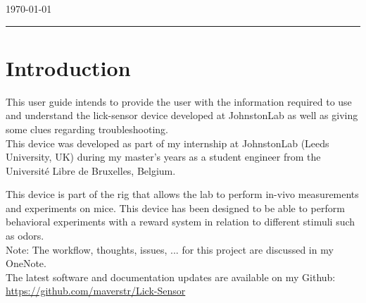 \documentclass[a4paper]{article}
\begin{document}
\begin{titlepage}


{\large \today}\\[2cm] %


\vfill %

\end{titlepage}


\noindent\rule{\textwidth}{1pt}

\tableofcontents

\newpage

\listoffigures

\newpage



\section{Introduction}
This user guide intends to provide the user with the information required to use and understand the lick-sensor device developed at JohnstonLab as well as giving some clues regarding troubleshooting.\\

This device was developed as part of my internship at JohnstonLab (Leeds University, UK) during my master's years as a student engineer from the Université Libre de Bruxelles, Belgium.

This device is part of the rig that allows the lab to perform in-vivo measurements and experiments on mice. This device has been designed to be able to perform behavioral experiments with a reward system in relation to different stimuli such as odors. \\

Note: The workflow, thoughts, issues, ... for this project are discussed in my OneNote.\\

The latest software and documentation updates are available on my Github: \url{https://github.com/maverstr/Lick-Sensor}
\end{document}

